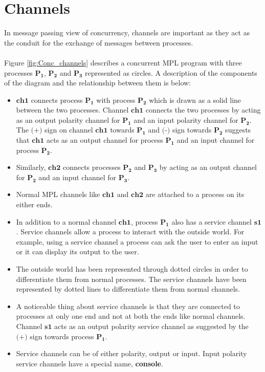 \documentclass[11pt]{article}
\newcommand{\<}{\langle}
\renewcommand{\>}{\rangle}
\begin{document}
\section {Channels}\label{Conc:ChanDesc}
In message passing view of concurrency, channels are important as they act as the conduit for the exchange of messages between processes. 
~~\\~~\\
Figure \ref {fig:Conc_channels} describes a concurrent MPL program with three processes $\mathbf{P_1}$, $\mathbf{P_2}$ and $\mathbf{P_3}$ represented as circles. A description of the components of the diagram and the relationship between them is below:
\begin {itemize}
  \item $\mathbf{ch1}$ connects process $\mathbf{P_1}$ with process $\mathbf{P_2}$ which is drawn as a solid line between the two processes. Channel $\mathbf{ch1}$ connects the two processes by acting as an output polarity channel for $\mathbf{P_1}$ and an input polarity channel for $\mathbf{P_2}$. The $\texttt{(+)}$ sign on channel $\mathbf{ch1}$ towards $\mathbf{P_1}$ and $\texttt{(-)}$ sign towards $\mathbf{P_2}$ suggests that $\mathbf{ch1}$ acts as an output channel for process $\mathbf{P_1}$ and an input channel for process $\mathbf{P_2}$.
  \item Similarly, $\mathbf{ch2}$ connects processes $\mathbf{P_2}$ and $\mathbf{P_3}$ by acting as an output channel for $\mathbf{P_2}$ and an input channel for $\mathbf{P_3}$.
  \item Normal MPL channels like $\mathbf{ch1}$ and $\mathbf{ch2}$ are attached to a process on its either ends. 
  \item In addition to a normal channel $\mathbf{ch1}$, process $\mathbf{P_1}$ also has a service channel $\mathbf{s1}$. Service channels allow a process to interact with the outside world. For example, using a service channel a process can ask the user to enter an input or it can display its output to the user.
  \item The outside world has been represented through dotted circles in order to differentiate them from normal processes. The service channels have been represented by dotted lines to differentiate them from normal channels.
  \item A noticeable thing about service channels is that they are connected to processes at only one end and not at both the ends like normal channels. Channel $\mathbf{s1}$ acts as an output polarity service channel as suggested by the $\texttt{(+)}$ sign towards process $\mathbf{P_1}$.
  \item Service channels can be of either polarity, output or input. Input polarity service channels have a special name, {\bf console}. 
\end {itemize}
\end{document}
